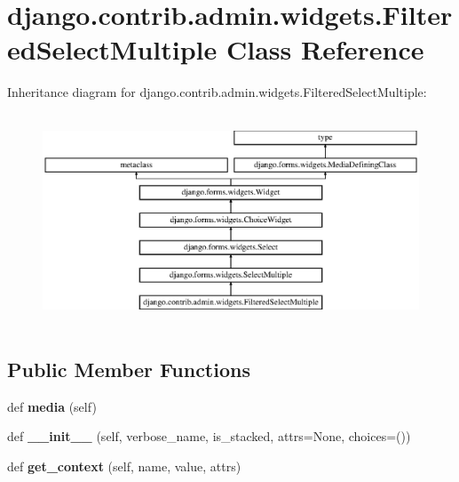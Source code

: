 \hypertarget{classdjango_1_1contrib_1_1admin_1_1widgets_1_1_filtered_select_multiple}{}\section{django.\+contrib.\+admin.\+widgets.\+Filtered\+Select\+Multiple Class Reference}
\label{classdjango_1_1contrib_1_1admin_1_1widgets_1_1_filtered_select_multiple}
Inheritance diagram for django.\+contrib.\+admin.\+widgets.\+Filtered\+Select\+Multiple\+:\begin{figure}[H]
\begin{center}
\leavevmode
\includegraphics[height=6.322580cm]{classdjango_1_1contrib_1_1admin_1_1widgets_1_1_filtered_select_multiple}
\end{center}
\end{figure}
\subsection*{Public Member Functions}
\begin{DoxyCompactItemize}
\item 
\mbox{\label{classdjango_1_1contrib_1_1admin_1_1widgets_1_1_filtered_select_multiple_a37c203eeafc1a171c6df0b7fe10576fb}} 
def {\bfseries media} (self)
\item 
\mbox{\label{classdjango_1_1contrib_1_1admin_1_1widgets_1_1_filtered_select_multiple_a10c45a9b40c74491ecfbe13065c988f2}} 
def {\bfseries \+\_\+\+\_\+init\+\_\+\+\_\+} (self, verbose\+\_\+name, is\+\_\+stacked, attrs=None, choices=())
\item 
\mbox{\label{classdjango_1_1contrib_1_1admin_1_1widgets_1_1_filtered_select_multiple_aa17c702c2e08140c258554336e6f4b70}} 
def {\bfseries get\+\_\+context} (self, name, value, attrs)
\end{DoxyCompactItemize}
